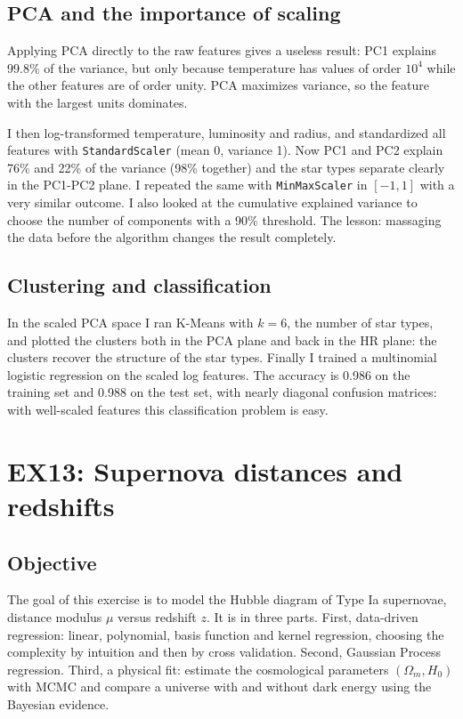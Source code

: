 \documentclass[11pt]{article}
\begin{document}
\subsection*{PCA and the importance of scaling}

Applying PCA directly to the raw features gives a useless result: PC1 explains 99.8\% of the variance, but only because temperature has values of order $10^4$ while the other features are of order unity. PCA maximizes variance, so the feature with the largest units dominates.

I then log-transformed temperature, luminosity and radius, and standardized all features with \texttt{StandardScaler} (mean 0, variance 1). Now PC1 and PC2 explain 76\% and 22\% of the variance (98\% together) and the star types separate clearly in the PC1-PC2 plane. I repeated the same with \texttt{MinMaxScaler} in $[-1,1]$ with a very similar outcome. I also looked at the cumulative explained variance to choose the number of components with a 90\% threshold. The lesson: massaging the data before the algorithm changes the result completely.

\subsection*{Clustering and classification}

In the scaled PCA space I ran K-Means with $k=6$, the number of star types, and plotted the clusters both in the PCA plane and back in the HR plane: the clusters recover the structure of the star types. Finally I trained a multinomial logistic regression on the scaled log features. The accuracy is 0.986 on the training set and 0.988 on the test set, with nearly diagonal confusion matrices: with well-scaled features this classification problem is easy.

\section{EX13: Supernova distances and redshifts}

\subsection*{Objective}

The goal of this exercise is to model the Hubble diagram of Type Ia supernovae, distance modulus $\mu$ versus redshift $z$. It is in three parts. First, data-driven regression: linear, polynomial, basis function and kernel regression, choosing the complexity by intuition and then by cross validation. Second, Gaussian Process regression. Third, a physical fit: estimate the cosmological parameters $(\Omega_m, H_0)$ with MCMC and compare a universe with and without dark energy using the Bayesian evidence.
\end{document}
